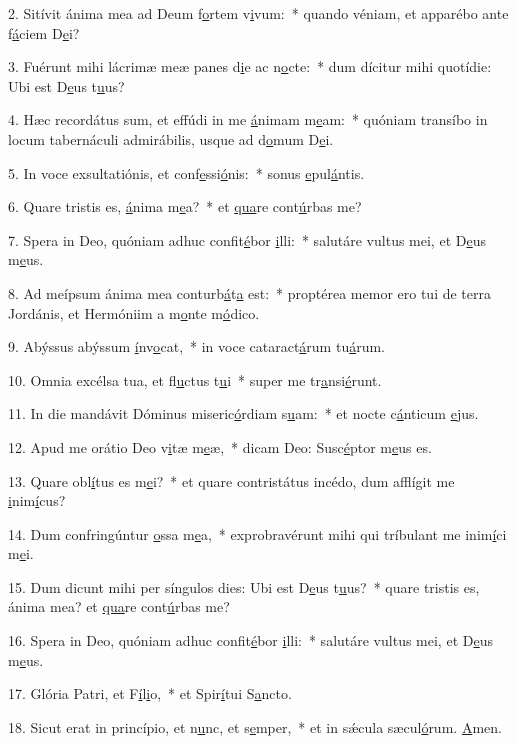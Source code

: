 2. Sitívit ánima mea ad Deum f\uline{o}rtem v\uline{i}vum:~* quando véniam, et apparébo ante f\uline{á}ciem D\uline{e}i?\par 
3. Fuérunt mihi lácrimæ meæ panes d\uline{i}e ac n\uline{o}cte:~* dum dícitur mihi quotídie: Ubi est D\uline{e}us t\uline{u}us?\par 
4. Hæc recordátus sum, et effúdi in me \uline{á}nimam m\uline{e}am:~* quóniam transíbo in locum tabernáculi admirábilis, usque ad d\uline{o}mum D\uline{e}i.\par 
5. In voce exsultatiónis, et conf\uline{e}ssi\uline{ó}nis:~* sonus \uline{e}pul\uline{á}ntis.\par 
6. Quare tristis es, \uline{á}nima m\uline{e}a?~* et \uline{qua}re cont\uline{ú}rbas me?\par 
7. Spera in Deo, quóniam adhuc confit\uline{é}bor \uline{i}lli:~* salutáre vultus mei, et D\uline{e}us m\uline{e}us.\par 
8. Ad meípsum ánima mea conturb\uline{á}t\uline{a} est:~* proptérea memor ero tui de terra Jordánis, et Hermóniim a m\uline{o}nte m\uline{ó}dico.\par 
9. Abýssus abýssum \uline{í}nv\uline{o}cat,~* in voce cataract\uline{á}rum tu\uline{á}rum.\par 
10. Omnia excélsa tua, et fl\uline{u}ctus t\uline{u}i~* super me tr\uline{a}nsi\uline{é}runt.\par 
11. In die mandávit Dóminus miseric\uline{ó}rdiam s\uline{u}am:~* et nocte c\uline{á}nticum \uline{e}jus.\par 
12. Apud me orátio Deo v\uline{i}tæ m\uline{e}æ,~* dicam Deo: Susc\uline{é}ptor m\uline{e}us es.\par 
13. Quare obl\uline{í}tus es m\uline{e}i?~* et quare contristátus incédo, dum afflígit me \uline{i}nim\uline{í}cus?\par 
14. Dum confringúntur \uline{o}ssa m\uline{e}a,~* exprobravérunt mihi qui tríbulant me inim\uline{í}ci m\uline{e}i.\par 
15. Dum dicunt mihi per síngulos dies: Ubi est D\uline{e}us t\uline{u}us?~* quare tristis es, ánima mea? et \uline{qua}re cont\uline{ú}rbas me?\par 
16. Spera in Deo, quóniam adhuc confit\uline{é}bor \uline{i}lli:~* salutáre vultus mei, et D\uline{e}us m\uline{e}us.\par 
17. Glória Patri, et F\uline{í}l\uline{i}o,~* et Spir\uline{í}tui S\uline{a}ncto.\par 
18. Sicut erat in princípio, et n\uline{u}nc, et s\uline{e}mper,~* et in sǽcula sæcul\uline{ó}rum. \uline{A}men.\par 
